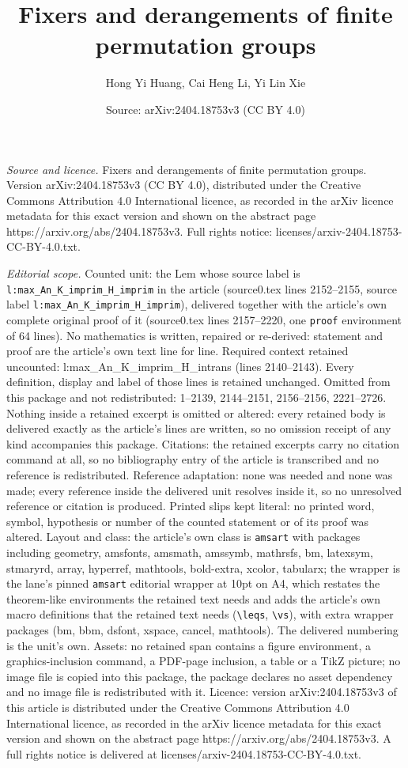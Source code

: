 \documentclass[10pt,a4paper]{amsart}
\title[Fixers and derangements of finite permutation groups]{Fixers and derangements of finite permutation groups}
\author{Hong Yi Huang, Cai Heng Li, Yi Lin Xie}
\date{Source: arXiv:2404.18753v3 (CC BY 4.0)}
\begin{document}
\maketitle

\noindent\emph{Source and licence.} Fixers and derangements of finite permutation groups. Version arXiv:2404.18753v3 (CC BY 4.0), distributed under the Creative Commons Attribution 4.0 International licence, as recorded in the arXiv licence metadata for this exact version and shown on the abstract page https://arxiv.org/abs/2404.18753v3. Full rights notice: licenses/arxiv-2404.18753-CC-BY-4.0.txt.\par\smallskip

\noindent\textit{Editorial scope.} Counted unit: the Lem whose source label is \texttt{l:max\_An\_K\_imprim\_H\_imprim} in the article (source0.tex lines 2152--2155, source label \texttt{l:max\_An\_K\_imprim\_H\_imprim}), delivered together with the article's own complete original proof of it (source0.tex lines 2157--2220, one \texttt{proof} environment of 64 lines). No mathematics is written, repaired or re-derived: statement and proof are the article's own text line for line. Required context retained uncounted: l:max\_An\_K\_imprim\_H\_intrans (lines 2140--2143). Every definition, display and label of those lines is retained unchanged. Omitted from this package and not redistributed: 1--2139, 2144--2151, 2156--2156, 2221--2726. Nothing inside a retained excerpt is omitted or altered: every retained body is delivered exactly as the article's lines are written, so no omission receipt of any kind accompanies this package. Citations: the retained excerpts carry no citation command at all, so no bibliography entry of the article is transcribed and no reference is redistributed. Reference adaptation: none was needed and none was made; every reference inside the delivered unit resolves inside it, so no unresolved reference or citation is produced. Printed slips kept literal: no printed word, symbol, hypothesis or number of the counted statement or of its proof was altered. Layout and class: the article's own class is \texttt{amsart} with packages including geometry, amsfonts, amsmath, amssymb, mathrsfs, bm, latexsym, stmaryrd, array, hyperref, mathtools, bold-extra, xcolor, tabularx; the wrapper is the lane's pinned \texttt{amsart} editorial wrapper at 10pt on A4, which restates the theorem-like environments the retained text needs and adds the article's own macro definitions that the retained text needs (\texttt{\textbackslash leqs}, \texttt{\textbackslash vs}), with extra wrapper packages (bm, bbm, dsfont, xspace, cancel, mathtools). The delivered numbering is the unit's own. Assets: no retained span contains a figure environment, a graphics-inclusion command, a PDF-page inclusion, a table or a TikZ picture; no image file is copied into this package, the package declares no asset dependency and no image file is redistributed with it. Licence: version arXiv:2404.18753v3 of this article is distributed under the Creative Commons Attribution 4.0 International licence, as recorded in the arXiv licence metadata for this exact version and shown on the abstract page https://arxiv.org/abs/2404.18753v3. A full rights notice is delivered at licenses/arxiv-2404.18753-CC-BY-4.0.txt. 
\end{document}
